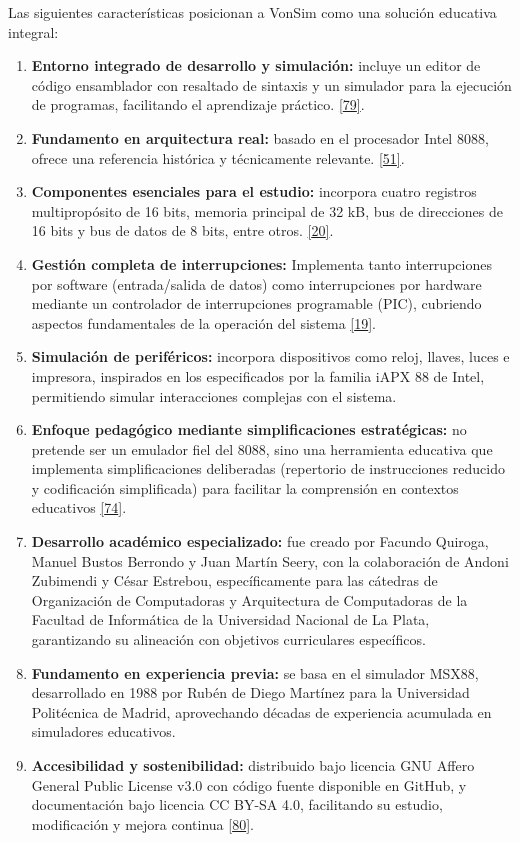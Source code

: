 \documentclass[12pt,oneside]{templates/unerthesis}
\begin{document}
Las siguientes características posicionan a VonSim como una solución educativa integral:

\begin{enumerate}
\def\labelenumi{\arabic{enumi}.}
\item
  \textbf{Entorno integrado de desarrollo y simulación:} incluye un editor de código ensamblador con resaltado de sintaxis y un simulador para la ejecución de programas, facilitando el aprendizaje práctico. \protect\hyperlink{ref-vonsim}{{[}79{]}}.
\item
  \textbf{Fundamento en arquitectura real:} basado en el procesador Intel 8088, ofrece una referencia histórica y técnicamente relevante. \protect\hyperlink{ref-intel8086manual}{{[}51{]}}.
\item
  \textbf{Componentes esenciales para el estudio:} incorpora cuatro registros multipropósito de 16 bits, memoria principal de 32 kB, bus de direcciones de 16 bits y bus de datos de 8 bits, entre otros. \protect\hyperlink{ref-stallings_computer_2021}{{[}20{]}}.
\item
  \textbf{Gestión completa de interrupciones:} Implementa tanto interrupciones por software (entrada/salida de datos) como interrupciones por hardware mediante un controlador de interrupciones programable (PIC), cubriendo aspectos fundamentales de la operación del sistema \protect\hyperlink{ref-hennessy2017computer}{{[}19{]}}.
\item
  \textbf{Simulación de periféricos:} incorpora dispositivos como reloj, llaves, luces e impresora, inspirados en los especificados por la familia iAPX 88 de Intel, permitiendo simular interacciones complejas con el sistema.
\item
  \textbf{Enfoque pedagógico mediante simplificaciones estratégicas:} no pretende ser un emulador fiel del 8088, sino una herramienta educativa que implementa simplificaciones deliberadas (repertorio de instrucciones reducido y codificación simplificada) para facilitar la comprensión en contextos educativos \protect\hyperlink{ref-patt2019introduction}{{[}74{]}}.
\item
  \textbf{Desarrollo académico especializado:} fue creado por Facundo Quiroga, Manuel Bustos Berrondo y Juan Martín Seery, con la colaboración de Andoni Zubimendi y César Estrebou, específicamente para las cátedras de Organización de Computadoras y Arquitectura de Computadoras de la Facultad de Informática de la Universidad Nacional de La Plata, garantizando su alineación con objetivos curriculares específicos.
\item
  \textbf{Fundamento en experiencia previa:} se basa en el simulador MSX88, desarrollado en 1988 por Rubén de Diego Martínez para la Universidad Politécnica de Madrid, aprovechando décadas de experiencia acumulada en simuladores educativos.
\item
  \textbf{Accesibilidad y sostenibilidad:} distribuido bajo licencia GNU Affero General Public License v3.0 con código fuente disponible en GitHub, y documentación bajo licencia CC BY-SA 4.0, facilitando su estudio, modificación y mejora continua \protect\hyperlink{ref-opensource_licensing_2024}{{[}80{]}}.
\end{enumerate}
\end{document}
